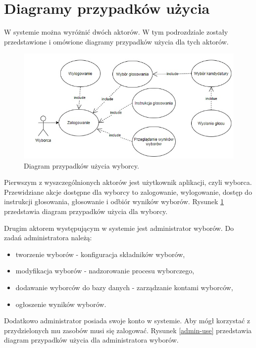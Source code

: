 \documentclass[a4paper,12pt]{book}
\begin{document}
\section{Diagramy przypadków użycia}

W systemie można wyróżnić dwóch aktorów. W tym podrozdziale zostały przedstawione i omówione diagramy przypadków użycia dla tych aktorów.

\begin{figure}[h]
	\centering
	\includegraphics[width=\textwidth]{images/user_use_case.jpg}
	\caption{Diagram przypadków użycia wyborcy.}\label{user-use}
\end {figure}

Pierwszym z wyszczególnionych aktorów jest użytkownik aplikacji, czyli wyborca. Przewidziane akcje dostępne dla wyborcy to zalogowanie, wylogowanie, dostęp do instrukcji głosowania, głosowanie i odbiór wyników wyborów. Rysunek \ref{user-use} przedstawia diagram przypadków użycia dla wyborcy.

Drugim aktorem występującym w systemie jest administrator wyborów. Do zadań administratora należą: 

\begin{itemize}
	\item tworzenie wyborów - konfiguracja składników wyborów,
	\item modyfikacja wyborów - nadzorowanie procesu wyborczego,
	\item dodawanie wyborców do bazy danych - zarządzanie kontami wyborców,
	\item ogłoszenie wyników wyborów.
\end{itemize}

Dodatkowo administrator posiada swoje konto w systemie. Aby mógł korzystać z przydzielonych mu zasobów musi się zalogować. Rysunek \ref{admin-use} przedstawia diagram przypadków użycia dla administratora wyborów.
\end{document}

